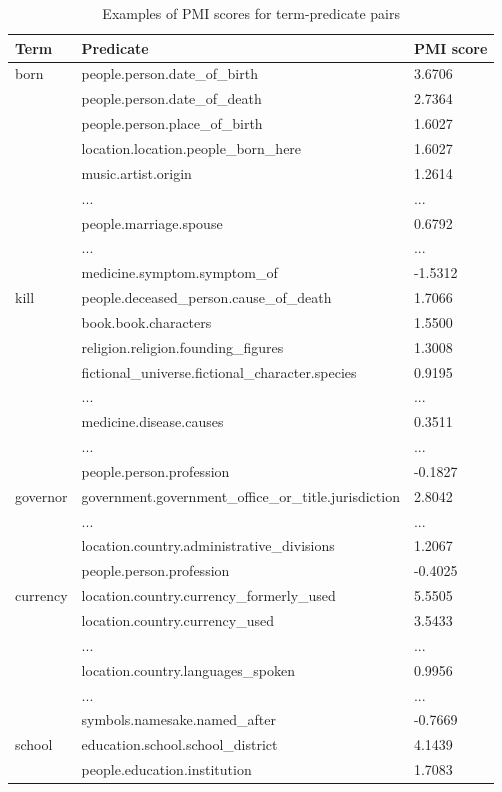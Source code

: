 \begin{table}
\caption{Examples of PMI scores for term-predicate pairs}
\label{table:cqa_npmi}
\begin{tabular}{| p{1.2cm} | p{5.0cm} | p{1.0cm} |}
\hline
Term & Predicate & PMI score\\
\hline
born & people.person.date\_of\_birth & 3.6706\\
 & people.person.date\_of\_death & 2.7364\\
 & people.person.place\_of\_birth & 1.6027\\
 & location.location.people\_born\_here & 1.6027\\
 & music.artist.origin & 1.2614\\
 & ... & ...\\
 & people.marriage.spouse & 0.6792\\
 & ... & ...\\
 & medicine.symptom.symptom\_of & -1.5312 \\
\hline
kill & people.deceased\_person.cause\_of\_death & 1.7066\\
& book.book.characters & 1.5500\\
& religion.religion.founding\_figures & 1.3008\\
& fictional\_universe.fictional\_character.species &  0.9195 \\
& ... & ... \\
& medicine.disease.causes & 0.3511 \\
& ... & ... \\
& people.person.profession & -0.1827\\
\hline
governor & government.government\_office\_or\_title.jurisdiction & 2.8042\\
& ... & ... \\
& location.country.administrative\_divisions & 1.2067\\
& people.person.profession & -0.4025 \\
\hline
currency & location.country.currency\_formerly\_used & 5.5505 \\
& location.country.currency\_used & 3.5433 \\
& ... & ...\\
& location.country.languages\_spoken & 0.9956\\
& ... & ...\\
& symbols.namesake.named\_after & -0.7669\\
\hline
school & education.school.school\_district & 4.1439 \\
& people.education.institution & 1.7083\\

\end{tabular}
\end{table}
